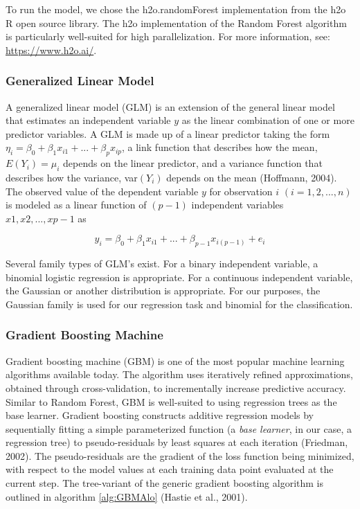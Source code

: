 \documentclass[12pt,]{article}
\begin{document}
To run the model, we chose the h2o.randomForest implementation from the
h2o R open source library. The h2o implementation of the Random Forest
algorithm is particularly well-suited for high parallelization. For more
information, see: \url{https://www.h2o.ai/}.

\hypertarget{generalized-linear-model}{%
\subsubsection{Generalized Linear
Model}\label{generalized-linear-model}}

A generalized linear model (GLM) is an extension of the general linear
model that estimates an independent variable \(y\) as the linear
combination of one or more predictor variables. A GLM is made up of a
linear predictor taking the form
\(\eta_i = \beta_0+\beta_1x_{i1}+...+\beta_{p}x_{ip}\), a link function
that describes how the mean, \(E(Y_i)=\mu_i\) depends on the linear
predictor, and a variance function that describes how the variance,
var\((Y_i)\) depends on the mean (Hoffmann, 2004). The observed value of
the dependent variable \(y\) for observation \(i\)
\((i = 1, 2, ..., n)\) is modeled as a linear function of \((p - 1)\)
independent variables \(x1, x2,... ,xp-1\) as

\[
y_i = \beta_0+\beta_1x_{i1}+...+\beta_{p-1}x_{i(p-1)}+e_i
\]

Several family types of GLM's exist. For a binary independent variable,
a binomial logistic regression is appropriate. For a continuous
independent variable, the Gaussian or another distribution is
appropriate. For our purposes, the Gaussian family is used for our
regression task and binomial for the classification.

\hypertarget{gradient-boosting-machine}{%
\subsubsection{Gradient Boosting
Machine}\label{gradient-boosting-machine}}

Gradient boosting machine (GBM) is one of the most popular machine
learning algorithms available today. The algorithm uses iteratively
refined approximations, obtained through cross-validation, to
incrementally increase predictive accuracy. Similar to Random Forest,
GBM is well-suited to using regression trees as the base learner.
Gradient boosting constructs additive regression models by sequentially
fitting a simple parameterized function (a \emph{base learner}, in our
case, a regression tree) to pseudo-residuals by least squares at each
iteration (Friedman, 2002). The pseudo-residuals are the gradient of the
loss function being minimized, with respect to the model values at each
training data point evaluated at the current step. The tree-variant of
the generic gradient boosting algorithm is outlined in algorithm
\ref{alg:GBMAlo} (Hastie et al., 2001).
\end{document}
